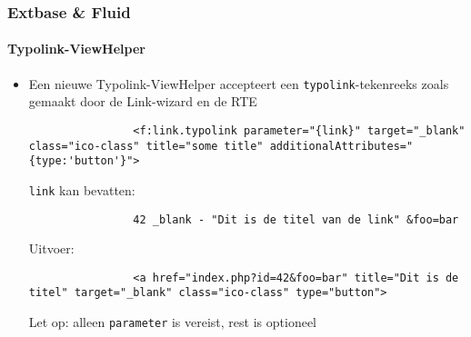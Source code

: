 
\begin{frame}[fragile]
	\frametitle{Extbase \& Fluid}
	\framesubtitle{Typolink-ViewHelper}

	\lstset{
		basicstyle=\tiny\ttfamily
	}

	\begin{itemize}
		\item Een nieuwe Typolink-ViewHelper accepteert een \texttt{typolink}-tekenreeks zoals gemaakt door de Link-wizard en de RTE

			\begin{lstlisting}
				<f:link.typolink parameter="{link}" target="_blank" class="ico-class" title="some title" additionalAttributes="{type:'button'}">
			\end{lstlisting}

			\texttt{link} kan bevatten:
			\begin{lstlisting}
				42 _blank - "Dit is de titel van de link" &foo=bar
			\end{lstlisting}

			Uitvoer:
			\begin{lstlisting}
				<a href="index.php?id=42&foo=bar" title="Dit is de titel" target="_blank" class="ico-class" type="button">
			\end{lstlisting}

			Let op: alleen \texttt{parameter} is vereist, rest is optioneel

	\end{itemize}

\end{frame}



